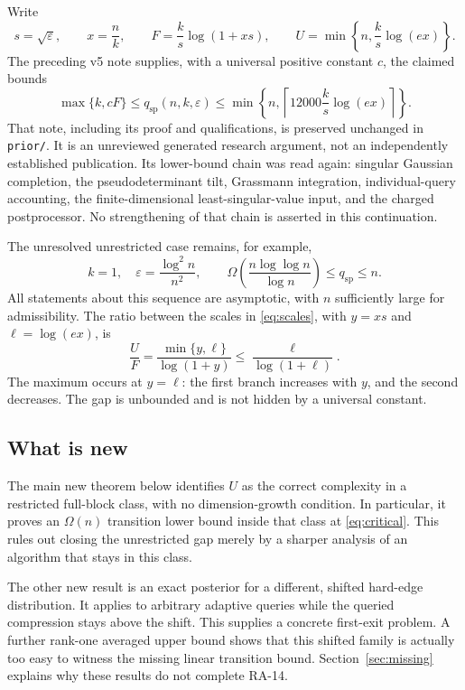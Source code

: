\documentclass[11pt]{article}
\theoremstyle{definition}
\newcommand{\qsp}{q_{\mathrm{sp}}}
\begin{document}
Write
\begin{equation}\label{eq:scales}
s=\sqrt\varepsilon,\qquad x=\frac nk,\qquad
F=\frac{k}{s}\log(1+xs),\qquad
U=\min\left\{n,\frac{k}{s}\log(ex)\right\}.
\end{equation}
The preceding v5 note supplies, with a universal positive constant $c$, the claimed bounds
\begin{equation}\label{eq:inherited}
\max\{k,cF\}\le\qsp(n,k,\varepsilon)
\le\min\left\{n,\left\lceil12000\frac{k}{s}\log(ex)\right\rceil\right\}.
\end{equation}
That note, including its proof and qualifications, is preserved unchanged in \texttt{prior/}. It is an unreviewed generated research argument, not an independently established publication. Its lower-bound chain was read again: singular Gaussian completion, the pseudodeterminant tilt, Grassmann integration, individual-query accounting, the finite-dimensional least-singular-value input, and the charged postprocessor. No strengthening of that chain is asserted in this continuation.

The unresolved unrestricted case remains, for example,
\begin{equation}\label{eq:critical}
k=1,\quad \varepsilon=\frac{\log^2n}{n^2},\qquad
\Omega\!\left(\frac{n\log\log n}{\log n}\right)
\le\qsp\le n.
\end{equation}
All statements about this sequence are asymptotic, with $n$ sufficiently large for admissibility. The ratio between the scales in \eqref{eq:scales}, with $y=xs$ and $\ell=\log(ex)$, is
\begin{equation}\label{eq:ratio}
\frac UF=\frac{\min\{y,\ell\}}{\log(1+y)}
\le\frac{\ell}{\log(1+\ell)}.
\end{equation}
The maximum occurs at $y=\ell$: the first branch increases with $y$, and the second decreases. The gap is unbounded and is not hidden by a universal constant.

\subsection{What is new}
The main new theorem below identifies $U$ as the correct complexity in a restricted full-block class, with no dimension-growth condition. In particular, it proves an $\Omega(n)$ transition lower bound inside that class at \eqref{eq:critical}. This rules out closing the unrestricted gap merely by a sharper analysis of an algorithm that stays in this class.

The other new result is an exact posterior for a different, shifted hard-edge distribution. It applies to arbitrary adaptive queries while the queried compression stays above the shift. This supplies a concrete first-exit problem. A further rank-one averaged upper bound shows that this shifted family is actually too easy to witness the missing linear transition bound. Section~\ref{sec:missing} explains why these results do not complete RA-14.
\end{document}
